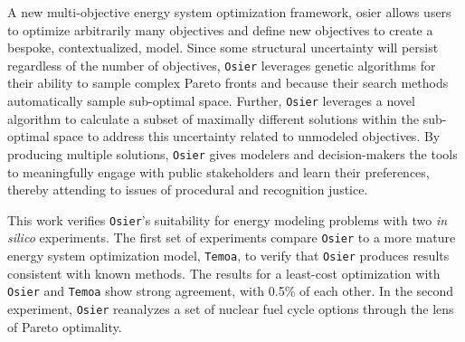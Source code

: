 A new multi-objective energy system optimization framework, \gls{osier} allows
users to optimize arbitrarily many objectives and define new objectives to
create a bespoke, contextualized, model. Since some structural uncertainty will
persist regardless of the number of objectives, \texttt{Osier} leverages genetic
algorithms for their ability to sample complex Pareto fronts and because their
search methods automatically sample sub-optimal space. Further, \texttt{Osier}
leverages a novel algorithm to calculate a subset of maximally different
solutions within the sub-optimal space to address this uncertainty related to
unmodeled objectives. By producing multiple solutions, \texttt{Osier} gives
modelers and decision-makers the tools to meaningfully engage with public
stakeholders and learn their preferences, thereby attending to issues of
procedural and recognition justice.

This work verifies \texttt{Osier}'s suitability for energy modeling problems
with two \textit{in silico} experiments. The first set of experiments compare
\texttt{Osier} to a more mature energy system optimization model,
\texttt{Temoa}, to verify that \texttt{Osier} produces results consistent with
known methods. The results for a least-cost optimization with \texttt{Osier} and
\texttt{Temoa} show strong agreement, with 0.5\% of each other. In the second
experiment, \texttt{Osier} reanalyzes a set of nuclear fuel cycle options through the
lens of Pareto optimality.
